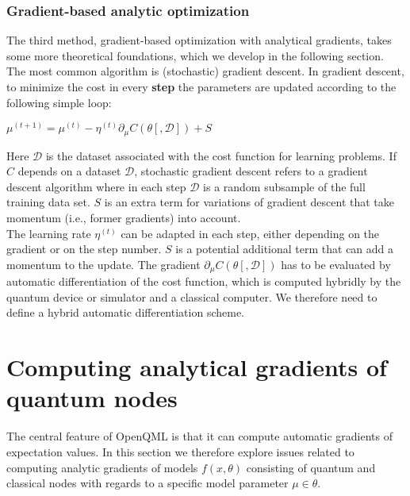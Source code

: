 \documentclass[aps,pra,10pt,twocolumn,groupedaddress,nofootinbib]{revtex4-1}
\theoremstyle{plain}
\begin{document}
\subsubsection{Gradient-based analytic optimization}

The third method, gradient-based optimization with analytical gradients, takes some more theoretical foundations, which we develop in the following section. The most common algorithm is (stochastic) gradient descent. In gradient descent, to minimize the cost in every \textbf{step} the parameters are updated according to the following simple loop:\\

\begin{algorithmic}[1]
\For {$\mu \in \theta $}
\State $\mu^{(t+1)} = \mu^{(t)} - \eta^{(t)} \partial_{\mu} C(\theta[, \mathcal{D}]) + S$
\EndFor
\EndProcedure
\end{algorithmic}

Here $\mathcal{D}$ is the dataset associated with the cost function for learning problems. If $C$ depends on a dataset $\mathcal{D}$, stochastic gradient descent refers to a gradient descent algorithm where in each step $\mathcal{D}$ is a random subsample of the full training data set. $S$ is an extra term for variations of gradient descent that take momentum (i.e., former gradients) into account. \\

The learning rate $\eta^{(t)}$ can be adapted in each step, either
depending on the gradient or on the step number. $S$ is a potential
additional term that can add a momentum to the update. The gradient
$\partial_{\mu} C(\theta[, \mathcal{D}])$ has to be evaluated by
automatic differentiation of the cost function, which is computed
hybridly by the quantum device or simulator and a classical
computer. We therefore need to define a hybrid automatic
differentiation scheme.




\section{Computing analytical gradients of quantum nodes}

The central feature of OpenQML is that it can compute automatic gradients of expectation values. In this section we therefore explore issues related to computing analytic gradients of models $f(x, \theta)$ consisting of quantum and classical nodes with regards to a specific model parameter $\mu \in \theta$.
\end{document}
